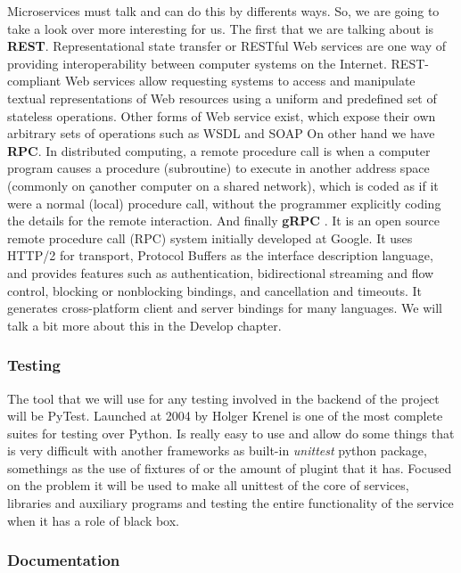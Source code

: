 Microservices must talk and can do this by differents ways. So, we are going to
take a look over more interesting for us.
\intro
The first that we are talking about is \textbf{REST}. Representational state transfer or
RESTful Web services are one way of providing interoperability between computer systems on the Internet. REST-compliant
Web services allow requesting systems to access and manipulate textual representations
of Web resources using a uniform and predefined set of stateless operations. Other
forms of Web service exist, which expose their own arbitrary sets of operations such as
WSDL and SOAP
\intro
On other hand we have \textbf{RPC}. In distributed computing, a remote procedure call  is when a computer program
causes a procedure (subroutine) to execute in another address space (commonly on
çanother computer on a shared network), which is coded as if it were a normal (local)
procedure call, without the programmer explicitly coding the details for the remote interaction.
\intro
And finally \textbf{gRPC} . It is an open source remote procedure call (RPC) system initially developed at
Google. It uses HTTP/2 for transport, Protocol Buffers as the interface description
language, and provides features such as authentication, bidirectional streaming and
flow control, blocking or nonblocking bindings, and cancellation and timeouts.
It generates cross-platform client and server bindings for many languages.
We will talk a bit more about this in the Develop chapter.


\subsubsection{Testing}

The tool that we will use for any testing involved in the backend of the project
will be PyTest. Launched at 2004 by Holger Krenel is one of the most complete
suites for testing over Python.
Is really easy to use and allow do some things that is very difficult with another
frameworks as built-in \textit{unittest} python package, somethings as the use of
fixtures of or the amount of plugint that it has.
\intro
Focused on the problem it will be used to make all unittest of the core of services,
libraries and auxiliary programs and testing the entire functionality of the service
when it has a role of black box.


\subsubsection{Documentation}

